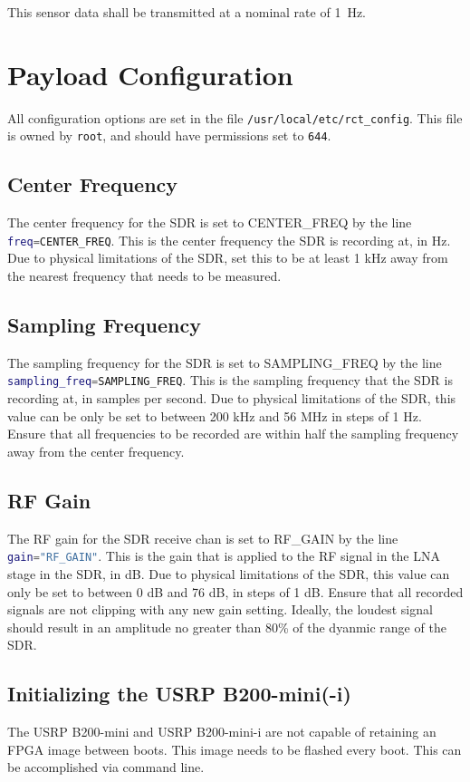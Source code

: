 \documentclass{report}
\begin{document}
				This sensor data shall be transmitted at a nominal rate of \SI{1}{\hertz}.
		\section{Payload Configuration}
			All configuration options are set in the file \lstinline[language=sh]{/usr/local/etc/rct_config}.  This file is owned by \lstinline[language=sh]{root}, and should have permissions set to \lstinline{644}.
			\subsection{Center Frequency}
				The center frequency for the SDR is set to CENTER\_FREQ by the line \lstinline[language=sh]{freq=CENTER_FREQ}.  This is the center frequency the SDR is recording at, in Hz.  Due to physical limitations of the SDR, set this to be at least 1 kHz away from the nearest frequency that needs to be measured.
			\subsection{Sampling Frequency}
				The sampling frequency for the SDR is set to SAMPLING\_FREQ by the line \lstinline[language=sh]{sampling_freq=SAMPLING_FREQ}.  This is the sampling frequency that the SDR is recording at, in samples per second.  Due to physical limitations of the SDR, this value can be only be set to between 200 kHz and 56 MHz in steps of 1 Hz.  Ensure that all frequencies to be recorded are within half the sampling frequency away from the center frequency.
			\subsection{RF Gain}
				The RF gain for the SDR receive chan is set to RF\_GAIN by the line \lstinline[language=sh]{gain="RF_GAIN"}.  This is the gain that is applied to the RF signal in the LNA stage in the SDR, in dB.  Due to physical limitations of the SDR, this value can only be set to between 0 dB and 76 dB, in steps of 1 dB.  Ensure that all recorded signals are not clipping with any new gain setting.  Ideally, the loudest signal should result in an amplitude no greater than 80\% of the dyanmic range of the SDR.
			\subsection{Initializing the USRP B200-mini(-i)}
				The USRP B200-mini and USRP B200-mini-i are not capable of retaining an FPGA image between boots.  This image needs to be flashed every boot.  This can be accomplished via command line.
\end{document}
